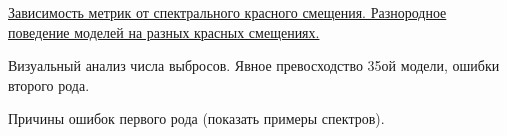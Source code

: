 \documentclass[fleqn,usenatbib]{mnras}
\begin{document}
\underline{Зависимость метрик от спектрального красного смещения. Разнородное поведение моделей на разных красных смещениях.}

Визуальный анализ числа выбросов. Явное превосходство 35ой модели, ошибки второго рода.

Причины ошибок первого рода (показать примеры спектров).

%
%
%
\end{document}
